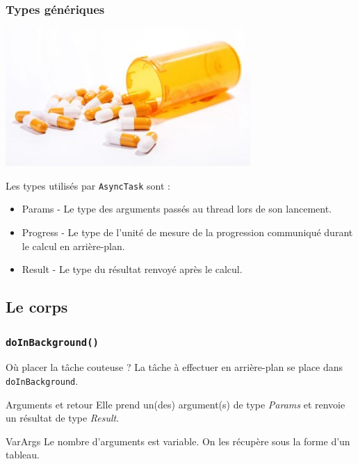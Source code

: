 \documentclass{beamer}
\begin{document}
\begin{frame}
\frametitle{Types génériques}

\begin{center}
\includegraphics[scale=0.5]{generic.jpg}
\end{center}
\begin{block}{Les types utilisés par \verb!AsyncTask! sont :}

\begin{itemize}
\item Params - Le type des arguments passés au thread lors de son lancement.
\item Progress - Le type de l'unité de mesure de la progression communiqué durant le calcul en arrière-plan.
\item Result - Le type du résultat renvoyé après le calcul.
\end{itemize}

\end{block}
\end{frame}

\subsection{Le corps}
\begin{frame}
\frametitle{\verb!doInBackground()!}
\begin{block}{Où placer la tâche couteuse ?}
La tâche à effectuer en arrière-plan se place dans \verb!doInBackground!.
\end{block}
\pause
\begin{block}{Arguments et retour}
Elle prend un(des) argument(s) de type \emph{Params} et renvoie un résultat de type \emph{Result}.
\end{block}
\pause
\begin{block}{VarArgs}
Le nombre d'arguments est variable. On les récupère sous la forme d'un tableau.
\end{block}
\end{frame}
\end{document}
